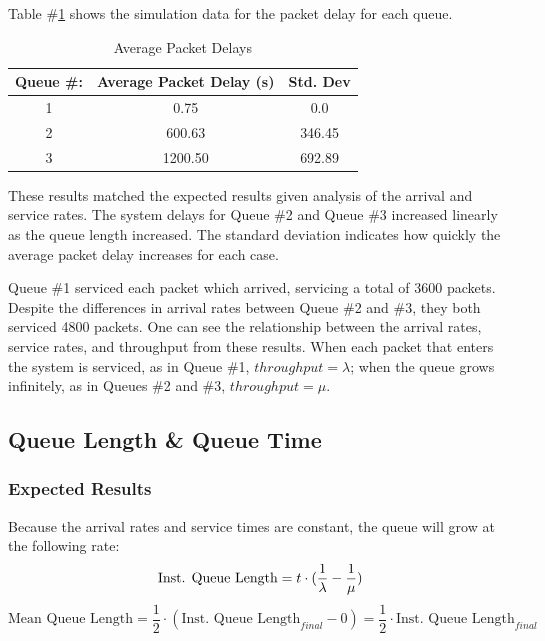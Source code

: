 \documentclass{article}
\begin{document}
\newpage

Table \#\ref{AvgPacketDelay} shows the simulation data for the packet delay for each queue.

\begin{table}[h!]
\centering
\begin{tabular}{|c|c|c|} \hline
\textbf{Queue \#:} & \textbf{Average Packet Delay (s)} & \textbf{Std. Dev} \\ \hline
1 & 0.75 & 0.0  \\ \hline
2 & 600.63 & 346.45   \\ \hline
3 & 1200.50 & 692.89 \\ \hline
\end{tabular}
\caption{Average Packet Delays }
\label{AvgPacketDelay}
\end{table}

These results matched the expected results given analysis of the arrival and service rates.
The system delays for Queue \#2 and Queue \#3 increased linearly as the queue length increased.  
The standard deviation indicates how quickly the average packet delay increases for each case.

Queue \#1 serviced each packet which arrived, servicing a total of 3600 packets.
Despite the differences in arrival rates between Queue \#2 and \#3, they both serviced 4800 packets.  
One can see the relationship between the arrival rates, service rates, and throughput from these results.
When each packet that enters the system is serviced, as in Queue \#1, $throughput = \lambda$; when the queue grows infinitely, as in Queues \#2 and \#3, $throughput = \mu$.

\subsection*{Queue Length \& Queue Time}
\subsubsection*{Expected Results}
Because the arrival rates and service times are constant, the queue will grow at the following rate:
\begin{equation}
\label{eq:qlen}
\text{Inst. Queue Length} = t \cdot (\frac{1}{\lambda} - \frac{1}{\mu}) \\
\end{equation}
\begin{equation}
\label{eq:avgQlen}
\text{Mean Queue Length} = \frac{1}{2} \cdot (\text{Inst. Queue Length}_{final} - 0)
						= \frac{1}{2} \cdot \text{Inst. Queue Length}_{final}
\end{equation}
\end{document}
